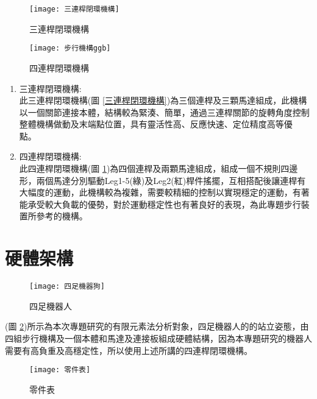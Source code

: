 \begin{figure}[htbp]
  \begin{minipage}[t]{0.5\linewidth}
    \centering
    \texttt{[image: 三連桿閉環機構]}
    \caption{三連桿閉環機構}
    \label{三連桿閉環機構}
  \end{minipage}
  \hfill
  \begin{minipage}[t]{0.4\linewidth}
    \centering
    \texttt{[image: 步行機構ggb]}
    \caption{四連桿閉環機構}
    \label{步行機構ggb}
  \end{minipage}
\end{figure}

\begin{enumerate}
\item 三連桿閉環機構:\\

此三連桿閉環機構(圖 \ref{三連桿閉環機構})為三個連桿及三顆馬達組成，此機構以一個關節連接本體，結構較為緊湊、簡單，通過三連桿關節的旋轉角度控制整體機構做動及末端點位置，具有靈活性高、反應快速、定位精度高等優點。\

\item 四連桿閉環機構:\\

此四連桿閉環機構(圖 \ref{步行機構ggb})為四個連桿及兩顆馬達組成，組成一個不規則四邊形，兩個馬達分別驅動Leg1-5(綠)及Leg2(紅)桿件搖擺，互相搭配後讓連桿有大幅度的運動，此機構較為複雜，需要較精細的控制以實現穩定的運動，有著能承受較大負載的優勢，對於運動穩定性也有著良好的表現，為此專題步行裝置所參考的機構。\\
\end{enumerate}

\section{硬體架構}
\begin{figure}[hbtp]
\begin{center}
\texttt{[image: 四足機器狗]}
\caption{\Large 四足機器人}\label{四足機器狗}
\end{center}
\end{figure}

(圖 \ref{四足機器狗})所示為本次專題研究的有限元素法分析對象，四足機器人的的站立姿態，由四組步行機構及一個本體和馬達及連接板組成硬體結構，因為本專題研究的機器人需要有高負重及高穩定性，所以使用上述所講的四連桿閉環機構。\
\newpage

\begin{figure}[hbt!]
\begin{center}
\texttt{[image: 零件表]}
\caption{\Large 零件表}\label{零件表}
\end{center}
\end{figure}
\newpage

